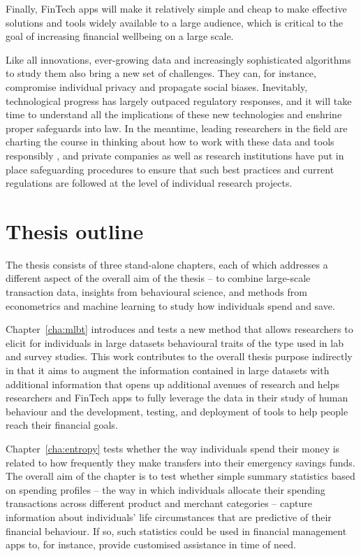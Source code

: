 Finally, FinTech apps will make it relatively simple and cheap to make
effective solutions and tools widely available to a large audience, which is
critical to the goal of increasing financial wellbeing on a large scale.

Like all innovations, ever-growing data and increasingly sophisticated algorithms to study them also bring a new set of challenges. They can, for instance, compromise individual privacy and propagate
social biases. Inevitably, technological progress has largely outpaced
regulatory responses, and it will take time to understand all the implications
of these new technologies and enshrine proper safeguards into law. In the
meantime, leading researchers in the field are charting the course in thinking
about how to work with these data and tools responsibly
\citep{demontjoye2015unique, kosinski2015facebook, blumenstock2018don}, and
private companies as well as research institutions have put in place
safeguarding procedures to ensure that such best practices and current
regulations are followed at the level of individual research projects.


\section{Thesis outline}%

The thesis consists of three stand-alone chapters, each of which addresses a
different aspect of the overall aim of the thesis -- to combine large-scale
transaction data, insights from behavioural science, and methods from
econometrics and machine learning to study how individuals spend and save. 

Chapter~\ref{cha:mlbt} introduces and tests a new method that allows
researchers to elicit for individuals in large datasets behavioural traits of the type used in lab and survey
studies. This work contributes to the overall
thesis purpose indirectly in that it aims to augment the information contained
in large datasets with additional information that opens up additional avenues
of research and helps researchers and FinTech apps to fully leverage the data in their study of
human behaviour and the development, testing, and deployment of tools to help people reach their financial goals.

Chapter~\ref{cha:entropy} tests whether the way individuals spend their money
is related to how frequently they make transfers into their emergency savings
funds. The overall aim of the chapter is to test whether simple summary
statistics based on spending profiles -- the way in which individuals
allocate their spending transactions across different product and merchant
categories -- capture information about individuals' life circumstances that
are predictive of their financial behaviour. If so, such statistics could be
used in financial management apps to, for instance, provide customised assistance in time of need.

